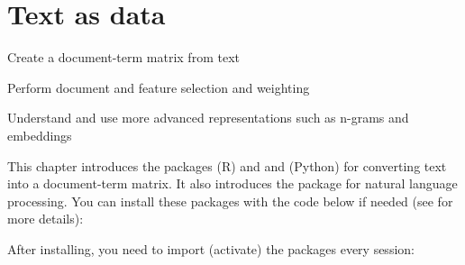 \chapter{Text as data}
\label{chap:dtm}

\begin{abstract}{Abstract}
  This chapter shows how you can analyze texts that are stored as a data frame column or variable using functions from the package  in R and the package  in Python and R.
  Please see  for more information on reading and cleaning text.
  
\end{abstract}


\begin{objectives}
\item Create a document-term matrix from text
\item Perform  document and feature selection and weighting
\item Understand and use more advanced representations such as n-grams and embeddings
\end{objectives}


\newpage
\begin{feature}
  This chapter introduces the packages  (R) and  and  (Python) for converting text into a document-term matrix. It also introduces the  package for natural language processing. 
You can install these packages with the code below if needed  (see  for more details):


\noindent After installing, you need to import (activate) the packages every session:


\end{feature}




